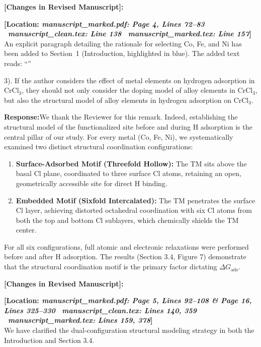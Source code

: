 \documentclass[11pt, sans, a4paper]{moderncv}
\newcommand{\response}{\vspace{0.4em}\noindent\textbf{\color{actionblue}Response:}\hspace{0.5em}}
\newcommand{\manuscriptchange}[1]{\vspace{0.4em}\noindent\textbf{\color{acsblue}[Changes in Revised Manuscript]:}\par\nopagebreak\vspace{0.15em}#1\vspace{0.4em}}
\begin{document}
\manuscriptchange{\textbf{[Location: \textit{manuscript\_marked.pdf: Page 4, Lines 72--83} \textbar\ \textit{manuscript\_clean.tex: Line 138} \textbar\ \textit{manuscript\_marked.tex: Line 157}]}\\ An explicit paragraph detailing the rationale for selecting Co, Fe, and Ni has been added to Section~1 (Introduction, highlighted in blue). The added text reads: ``{\itshape \ExecuteMetaData[manuscript_marked.tex]{R1C2Rationale}}''}

\vspace{0.8em}

\begin{reviewercomment}
3). If the author considers the effect of metal elements on hydrogen adsorption in $\text{CrCl}_3$, they should not only consider the doping model of alloy elements in $\text{CrCl}_3$, but also the structural model of alloy elements in hydrogen adsorption on $\text{CrCl}_3$.
\end{reviewercomment}

\response We thank the Reviewer for this remark. Indeed, establishing the structural model of the functionalized site before and during H adsorption is the central pillar of our study. For every metal (Co, Fe, Ni), we systematically examined two distinct structural coordination configurations:
\begin{enumerate}[leftmargin=1.5em, itemsep=0.2em]
\item \textbf{Surface-Adsorbed Motif (Threefold Hollow):} The TM sits above the basal Cl plane, coordinated to three surface Cl atoms, retaining an open, geometrically accessible site for direct H binding.
\item \textbf{Embedded Motif (Sixfold Intercalated):} The TM penetrates the surface Cl layer, achieving distorted octahedral coordination with six Cl atoms from both the top and bottom Cl sublayers, which chemically shields the TM center.
\end{enumerate}
For all six configurations, full atomic and electronic relaxations were performed before and after H adsorption. The results (Section 3.4, Figure 7) demonstrate that the structural coordination motif is the primary factor dictating $\Delta G_{\mathrm{ads}}$.

\manuscriptchange{\textbf{[Location: \textit{manuscript\_marked.pdf: Page 5, Lines 92--108 \& Page 16, Lines 325--330} \textbar\ \textit{manuscript\_clean.tex: Lines 140, 359} \textbar\ \textit{manuscript\_marked.tex: Lines 159, 378}]}\\ We have clarified the dual-configuration structural modeling strategy in both the Introduction and Section 3.4.}
\end{document}
